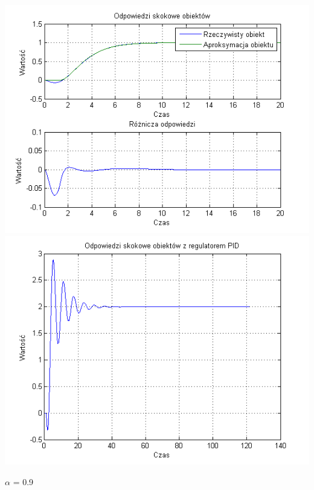 \documentclass[10pt,a4paper]{article}
\begin{document}
\begin{center}
\includegraphics[scale=1]{images/dwa/skrypt_239.png}\\
\includegraphics[scale=1]{images/dwa/skrypt_240.png}\\
\end{center}
\newpage
$\alpha$ = 0.9
\end{document}
